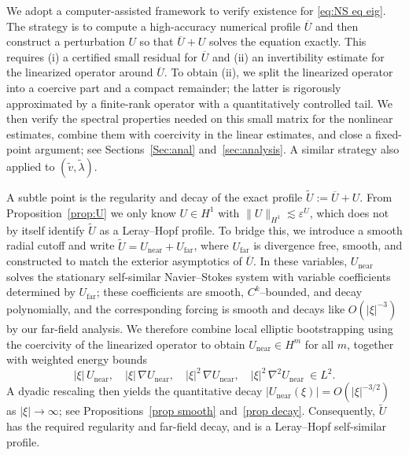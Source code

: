 \documentclass[11pt,a4paper]{article}
\numberwithin{equation}{section}
\begin{document}
We adopt a computer-assisted framework to verify existence for \eqref{eq:NS eq eig}. The strategy is to
compute a high-accuracy numerical profile $\overline U$ and then construct a perturbation $U$ so that
$\overline U+U$ solves the equation exactly. This requires (i) a certified small residual for $\overline U$
and (ii) an invertibility estimate for the linearized operator around $\overline U$. To obtain (ii), we split
the linearized operator into a coercive part and a compact remainder; the latter is rigorously approximated
by a finite-rank operator with a quantitatively controlled tail. We then verify the spectral
properties needed on this small matrix for the nonlinear estimates, combine them with coercivity in the linear estimates, and close a
fixed-point argument; see Sections~\ref{Sec:anal} and~\ref{sec:analysis}. A similar strategy also applied to $(\widetilde{v},\widetilde{\lambda})$.

A subtle point is the regularity and decay of the exact profile
$\widetilde U:=\overline U+U$. From Proposition~\ref{prop:U} we only know $U\in H^1$ with
$\|U\|_{H^1}\lesssim \varepsilon^U$, which does not by itself identify $\widetilde U$ as a
Leray--Hopf profile. To bridge this, we introduce a smooth radial cutoff  and write
$\widetilde U=U_{\mathrm{near}}+U_{\mathrm{far}}$, where $U_{\mathrm{far}}$ is divergence free, smooth, and
constructed to match the exterior asymptotics of $\overline U$. In these variables, $U_{\mathrm{near}}$ solves the stationary self-similar
Navier--Stokes system with variable coefficients determined by $U_{\mathrm{far}}$; these coefficients are
smooth, $C^k$--bounded, and decay polynomially, and the corresponding forcing is smooth and decays like
$O(|\xi|^{-3})$ by our far-field analysis. %
We therefore combine local elliptic bootstrapping
 using the coercivity of the linearized operator to obtain
$U_{\mathrm{near}}\in H^m$ for all $m$, together with weighted energy bounds
\[
|\xi|\,U_{\mathrm{near}},\quad |\xi|\,\nabla U_{\mathrm{near}},\quad
|\xi|^{2}\,\nabla U_{\mathrm{near}},\quad |\xi|^{2}\,\nabla^{2} U_{\mathrm{near}} \ \in L^{2}.
\]
A dyadic rescaling then yields the quantitative decay
$|U_{\mathrm{near}}(\xi)|=O(|\xi|^{-3/2})$ as $|\xi|\to\infty$; see
Propositions~\ref{prop smooth} and~\ref{prop decay}. Consequently, $\widetilde U$ has the required
regularity and far-field decay, and is a Leray--Hopf self-similar profile.
\end{document}
